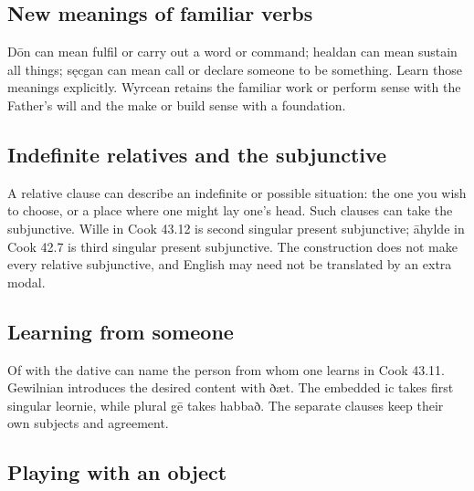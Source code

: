\subsection*{New meanings of familiar verbs}

Dōn can mean fulfil or carry out a word or command; healdan can mean sustain all things; sęcgan can mean call or declare someone to be something. Learn those meanings explicitly. Wyrcean retains the familiar work or perform sense with the Father’s will and the make or build sense with a foundation.

\subsection*{Indefinite relatives and the subjunctive}

A relative clause can describe an indefinite or possible situation: the one you wish to choose, or a place where one might lay one’s head. Such clauses can take the subjunctive. Wille in Cook 43.12 is second singular present subjunctive; āhylde in Cook 42.7 is third singular present subjunctive. The construction does not make every relative subjunctive, and English may need not be translated by an extra modal.

\subsection*{Learning from someone}

Of with the dative can name the person from whom one learns in Cook 43.11. Gewilnian introduces the desired content with ðæt. The embedded ic takes first singular leornie, while plural gē takes habbað. The separate clauses keep their own subjects and agreement.

\subsection*{Playing with an object}

